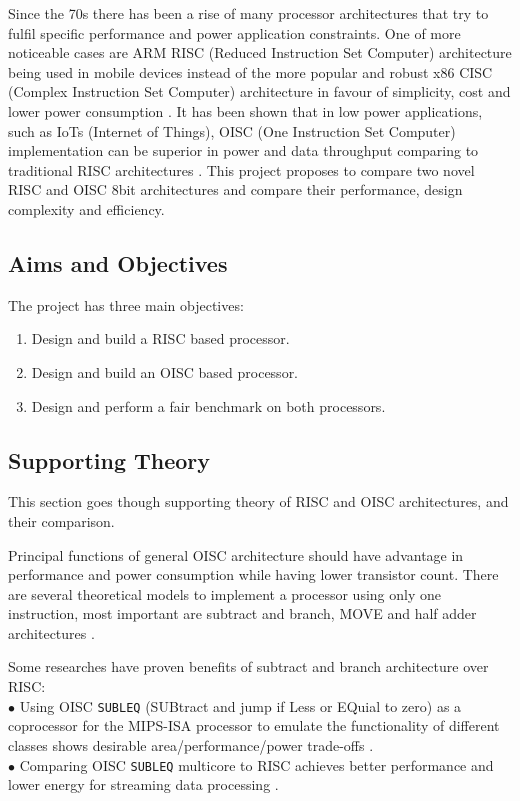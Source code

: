 Since the 70s there has been a rise of many processor architectures that try to fulfil specific performance and power application constraints. One of more noticeable cases are ARM RISC (Reduced Instruction Set Computer) architecture being used in mobile devices instead of the more popular and robust x86 CISC (Complex Instruction Set Computer) architecture in favour of simplicity, cost and lower power consumption \autocite{jamil_1995,blem_menon_sankaralingam_2013}. It has been shown that in low power applications, such as IoTs (Internet of Things), OISC (One Instruction Set Computer) implementation can be superior in power and data throughput comparing to traditional RISC architectures \autocite{yokota_saso_hara-azumi_2017, ahmed_sakamoto_anderson_hara-azumi_2015}. This project proposes to compare two novel RISC and OISC 8bit architectures and compare their performance, design complexity and efficiency.


\subsection{Aims and Objectives}

The project has three main objectives:
\begin{enumerate}
	\item Design and build a RISC based processor.
	\item Design and build an OISC based processor. 
	\item Design and perform a fair benchmark on both processors. 
\end{enumerate}

\subsection{Supporting Theory}
\label{subsec:supporting_theory}
This section goes though supporting theory of RISC and OISC architectures, and their comparison.

Principal functions of general OISC architecture should have advantage in performance and power consumption while having lower transistor count. There are several theoretical models to implement a processor using only one instruction, most important are subtract and branch, MOVE and half adder architectures \autocite{gilreath_laplante_2003}. 

Some researches have proven benefits of subtract and branch architecture over RISC:\\
$\bullet$ Using OISC \texttt{SUBLEQ} (SUBtract and jump if Less or EQuial to zero) as a coprocessor for the MIPS-ISA processor to emulate the functionality of different classes shows desirable area/performance/power trade-offs \autocite{ahmed_sakamoto_anderson_hara-azumi_2015}.\\
$\bullet$ Comparing OISC \texttt{SUBLEQ} multicore to RISC achieves better performance and lower energy for streaming data processing \autocite{yokota_saso_hara-azumi_2017}.


